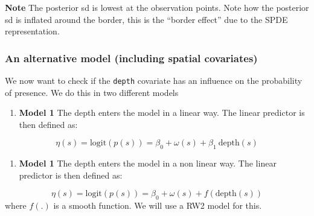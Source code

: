 \documentclass[
  letterpaper,
  DIV=11,
  numbers=noendperiod]{scrartcl}
\providecommand{\tightlist}{%
  \setlength{\itemsep}{0pt}\setlength{\parskip}{0pt}}\usepackage{longtable,booktabs,array}
\begin{document}
\textbf{Note} The posterior sd is lowest at the observation points. Note
how the posterior sd is inflated around the border, this is the ``border
effect'' due to the SPDE representation.

\subsubsection{An alternative model (including spatial
covariates)}\label{an-alternative-model-including-spatial-covariates}

We now want to check if the \texttt{depth} covariate has an influence on
the probability of presence. We do this in two different models

\begin{enumerate}
\def\labelenumi{\arabic{enumi}.}
\tightlist
\item
  \textbf{Model 1} The depth enters the model in a linear way. The
  linear predictor is then defined as:
\end{enumerate}

\[
  \eta(s) = \text{logit}(p(s)) = \beta_0 + \omega(s) + \beta_1\ \text{depth}(s)
\]

\begin{enumerate}
\def\labelenumi{\arabic{enumi}.}
\setcounter{enumi}{1}
\tightlist
\item
  \textbf{Model 1} The depth enters the model in a non linear way. The
  linear predictor is then defined as:
\end{enumerate}

\[
  \eta(s) = \text{logit}(p(s)) = \beta_0 + \omega(s) +  f(\text{depth}(s))
\] where \(f(.)\) is a smooth function. We will use a RW2 model for
this.
\end{document}
